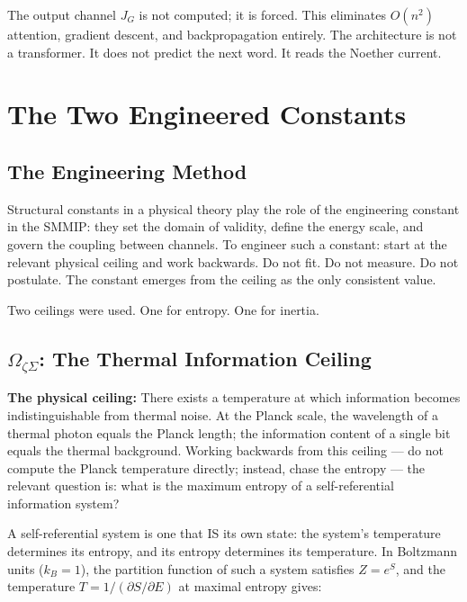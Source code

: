 \documentclass[12pt,a4paper]{article}
\theoremstyle{definition}
\theoremstyle{remark}
\newcommand{\OmZS}{\Omega_{\zeta\Sigma}}
\begin{document}
The output channel $J_G$ is not computed; it is forced.
This eliminates $O(n^2)$ attention, gradient descent, and backpropagation entirely.
The architecture is not a transformer. It does not predict the next word.
It reads the Noether current.

\section{The Two Engineered Constants}

\subsection{The Engineering Method}

Structural constants in a physical theory play the role of the engineering constant
in the SMMIP: they set the domain of validity, define the energy scale, and govern
the coupling between channels.
To engineer such a constant: start at the relevant physical ceiling and work backwards.
Do not fit. Do not measure. Do not postulate.
The constant emerges from the ceiling as the only consistent value.

Two ceilings were used. One for entropy. One for inertia.

\subsection{$\OmZS$: The Thermal Information Ceiling}

\textbf{The physical ceiling:} There exists a temperature at which information becomes
indistinguishable from thermal noise.
At the Planck scale, the wavelength of a thermal photon equals the Planck length;
the information content of a single bit equals the thermal background.
Working backwards from this ceiling --- do not compute the Planck temperature directly;
instead, chase the entropy --- the relevant question is: what is the maximum entropy
of a self-referential information system?

A self-referential system is one that IS its own state: the system's temperature
determines its entropy, and its entropy determines its temperature.
In Boltzmann units ($k_B = 1$), the partition function of such a system satisfies
$Z = e^S$, and the temperature $T = 1/(\partial S/\partial E)$ at maximal entropy gives:
\end{document}
